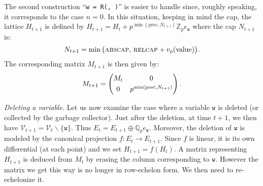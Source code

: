 \documentclass[sigconf]{acmart}
\newcommand{\Z}{\mathbb Z}
\newcommand{\Zp}{\Z_p}
\newcommand{\Q}{\mathbb Q}
\newcommand{\Qp}{\Q_p}
\newcommand{\calV}{\mathcal{V}}
\newcommand{\ttw}{\texttt{w}\xspace}
\theoremstyle{definition}
\begin{document}
\smallskip

The second construction
``\verb?w = ?\verb?R(?\verb?, ?\verb?)?''
is easier to handle since, roughly speaking, it corresponds to the
case $n = 0$.
In this situation, keeping in mind the cap, the lattice $H_{t+1}$ is 
defined by
$H_{t+1} = H_t + p^{\min(\text{prec}, N_{t+1})} \Zp e_\ttw$
where the cap $N_{t+1}$ is:
$$N_{t+1} = \min\big(\textsc{abscap},\, \textsc{relcap} + 
v_p(\text{value})\big).$$
The corresponding matrix $M_{t+1}$ is then given by:
$$M_{t+1} = \left(\begin{matrix}
M_t & 0 \smallskip \\ 0 & p^{\min(\text{prec}, N_{t+1})}
\end{matrix}\right).$$

\medskip

\noindent \textit{Deleting a variable.}
%
Let us now examine the case where a variable $\ttw$ is deleted (or 
collected by the garbage collector). Just after the deletion, at
time $t{+}1$, we then have $\calV_{t+1} = \calV_t \backslash \{\ttw\}$.
Thus $E_t = E_{t+1} \oplus \Qp e_\ttw$. Moreover, the deletion of $\ttw$
is modeled by the canonical projection $f : E_t \to E_{t+1}$. Since $f$
is linear, it is its own differential (at each point) and we set 
$H_{t+1} = f(H_t)$.
A matrix representing $H_{t+1}$ is deduced from $M_t$ by erasing the 
column corresponding to $\ttw$. However the matrix we get this way is 
no longer in row-echelon form. We then need to re-echelonize it.

\smallskip
\end{document}
